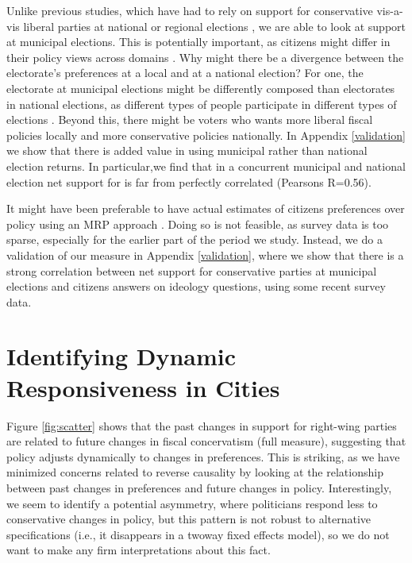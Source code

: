 \documentclass[a4paper,12pt]{article}
\begin{document}
 Unlike previous studies, which have had to rely on support for conservative vis-a-vis liberal parties at national or regional elections \citep[e.g.,]{hajnal2010or,einstein2016pushing}, we are able to look at support at municipal elections. This is potentially important, as citizens might differ in their policy views across domains \cite[for an argument along these lines, see]{abrams2012big}.  Why might there be a divergence between the electorate's preferences at a local and at a national election?  For one, the electorate at municipal elections might be differently composed than electorates in national elections, as different types of people participate in different types of elections \citep{ansolabehere2015beyond,hansen2017social}. Beyond this, there might be voters who wants more liberal fiscal policies locally and more conservative policies nationally. In Appendix  \ref{validation} we show that there is added value in using municipal rather than national election returns. In particular,we find that in a concurrent municipal and national election net support for is far from perfectly correlated (Pearsons R=0.56).
 
 It might have been preferable to have actual estimates of citizens preferences over policy using an MRP approach \citep[similar to the measure used by][]{tausanovitch2014representation}. Doing so is not feasible, as survey data is too sparse, especially for the earlier part of the period we study. Instead, we do a validation of our measure in Appendix \ref{validation}, where we show that there is a strong correlation between net support for conservative parties at municipal elections and citizens answers on ideology questions, using some recent survey data.


\section*{Identifying Dynamic Responsiveness in Cities}
Figure \ref{fig:scatter} shows that the past changes in support for right-wing parties are related to future changes in fiscal concervatism (full measure), suggesting that  policy adjusts dynamically to changes in preferences. This is striking, as we have minimized concerns related to reverse causality by looking at the relationship between past changes in preferences and future changes in policy. Interestingly, we seem to identify a potential asymmetry, where politicians respond less to conservative changes in policy, but this pattern is not robust to alternative specifications (i.e., it disappears in a twoway fixed effects model), so we do not want to make any firm interpretations about this fact.
\end{document}

